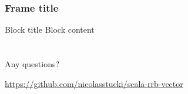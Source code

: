 \documentclass{beamer}
\begin{document}
\begin{frame}[fragile]
	\frametitle{Frame title}
	\begin{block}{Block title}
		Block content
	\end{block}
\end{frame}

\section{} 

\begin{frame}
 \vspace{3cm}
\Huge{\centerline{Any questions?}} \vspace{2cm}
\centerline{\small{\url{https://github.com/nicolasstucki/scala-rrb-vector}}}
\end{frame}

\end{document}
